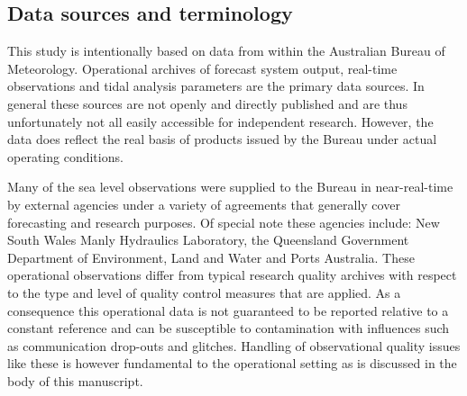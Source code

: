 \subsection{Data sources and terminology}
This study is intentionally based on data from within the Australian Bureau of Meteorology.
Operational archives of forecast system output, real-time observations and tidal analysis parameters are the primary data sources. In general these sources are not openly and directly published and are thus unfortunately not all easily accessible for independent research. However, the data does reflect the real basis of products issued by the Bureau under actual operating conditions.

Many of the sea level observations were supplied to the Bureau in near-real-time by external agencies under a variety of agreements that generally cover forecasting and research purposes.   Of special note these agencies include: New South Wales Manly Hydraulics Laboratory, the Queensland Government Department of Environment, Land and Water and Ports Australia.
These operational observations differ from typical research quality archives with respect to the type and level of quality control measures that are applied.   As a consequence this operational data is not guaranteed to be reported relative to a constant reference and can be susceptible to contamination with influences such as communication drop-outs and glitches.  Handling of observational quality issues like these is however fundamental to the operational setting as is discussed in the body of this manuscript. 



